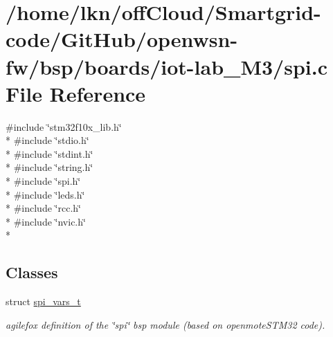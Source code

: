 \hypertarget{iot-lab___m3_2spi_8c}{}\section{/home/lkn/off\+Cloud/\+Smartgrid-\/code/\+Git\+Hub/openwsn-\/fw/bsp/boards/iot-\/lab\+\_\+\+M3/spi.c File Reference}
\label{iot-lab___m3_2spi_8c}
{\ttfamily \#include \char`\"{}stm32f10x\+\_\+lib.\+h\char`\"{}}\\*
{\ttfamily \#include \char`\"{}stdio.\+h\char`\"{}}\\*
{\ttfamily \#include \char`\"{}stdint.\+h\char`\"{}}\\*
{\ttfamily \#include \char`\"{}string.\+h\char`\"{}}\\*
{\ttfamily \#include \char`\"{}spi.\+h\char`\"{}}\\*
{\ttfamily \#include \char`\"{}leds.\+h\char`\"{}}\\*
{\ttfamily \#include \char`\"{}rcc.\+h\char`\"{}}\\*
{\ttfamily \#include \char`\"{}nvic.\+h\char`\"{}}\\*
\subsection*{Classes}
\begin{DoxyCompactItemize}
\item 
struct \hyperlink{structspi__vars__t}{spi\+\_\+vars\+\_\+t}
\begin{DoxyCompactList}\small\item\em agilefox definition of the \char`\"{}spi\char`\"{} bsp module (based on openmote\+S\+T\+M32 code). \end{DoxyCompactList}\end{DoxyCompactItemize}
